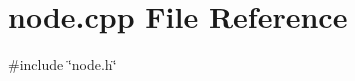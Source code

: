 \section{node.\-cpp \-File \-Reference}
\label{node_8cpp}
{\ttfamily \#include \char`\"{}node.\-h\char`\"{}}\*
